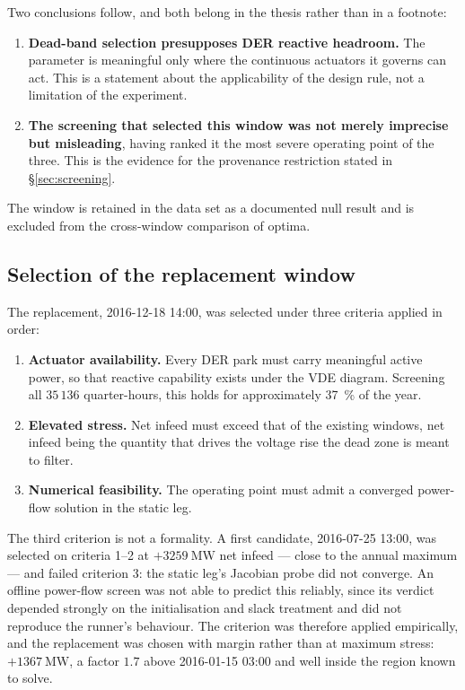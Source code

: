 \documentclass[11pt,a4paper]{article}
\begin{document}
Two conclusions follow, and both belong in the thesis rather than in a
footnote:

\begin{enumerate}
  \item \textbf{Dead-band selection presupposes DER reactive headroom.} The
    parameter is meaningful only where the continuous actuators it governs can
    act. This is a statement about the applicability of the design rule, not a
    limitation of the experiment.
  \item \textbf{The screening that selected this window was not merely
    imprecise but misleading}, having ranked it the most severe operating point
    of the three. This is the evidence for the provenance restriction stated in
    \S\ref{sec:screening}.
\end{enumerate}

The window is retained in the data set as a documented null result and is
excluded from the cross-window comparison of optima.

\subsection{Selection of the replacement window}

The replacement, 2016-12-18 14:00, was selected under three criteria applied in
order:

\begin{enumerate}
  \item \textbf{Actuator availability.} Every DER park must carry meaningful
    active power, so that reactive capability exists under the VDE diagram.
    Screening all $35\,136$ quarter-hours, this holds for approximately
    \SI{37}{\percent} of the year.
  \item \textbf{Elevated stress.} Net infeed must exceed that of the existing
    windows, net infeed being the quantity that drives the voltage rise the
    dead zone is meant to filter.
  \item \textbf{Numerical feasibility.} The operating point must admit a
    converged power-flow solution in the static leg.
\end{enumerate}

The third criterion is not a formality. A first candidate, 2016-07-25 13:00,
was selected on criteria 1--2 at $+\SI{3259}{\mega\watt}$ net infeed --- close to
the annual maximum --- and failed criterion 3: the static leg's Jacobian probe
did not converge. An offline power-flow screen was not able to predict this
reliably, since its verdict depended strongly on the initialisation and slack
treatment and did not reproduce the runner's behaviour. The criterion was
therefore applied empirically, and the replacement was chosen with margin
rather than at maximum stress: $+\SI{1367}{\mega\watt}$, a factor $1.7$ above
2016-01-15 03:00 and well inside the region known to solve.
\end{document}
